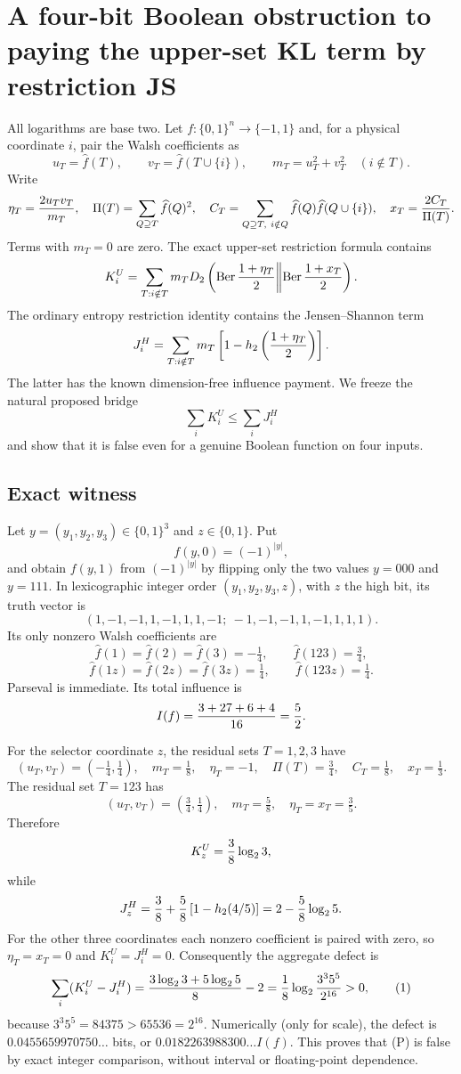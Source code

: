 \section*{A four-bit Boolean obstruction to paying the upper-set KL term by restriction JS}

All logarithms are base two.  Let $f:\{0,1\}^n\to\{-1,1\}$ and, for a
physical coordinate $i$, pair the Walsh coefficients as
\[
 u_T=\widehat f(T),\qquad v_T=\widehat f(T\cup\{i\}),\qquad
 m_T=u_T^2+v_T^2\quad (i\notin T).
\]
Write
\[
 \eta_T={2u_Tv_T\over m_T},\quad
 \Pi(T)=\sum_{Q\supseteq T}\widehat f(Q)^2,\quad
 C_T=\sum_{Q\supseteq T,\ i\notin Q}\widehat f(Q)\widehat f(Q\cup\{i\}),
 \quad x_T={2C_T\over\Pi(T)}.
\]
Terms with $m_T=0$ are zero.  The exact upper-set restriction formula contains
\[
 K_i^U=\sum_{T:i\notin T}m_T
 D_2\left(\operatorname{Ber}{1+\eta_T\over2}
 \middle\|\operatorname{Ber}{1+x_T\over2}\right).
\]
The ordinary entropy restriction identity contains the Jensen--Shannon term
\[
 J_i^H=\sum_{T:i\notin T}m_T
 \left[1-h_2\left({1+\eta_T\over2}\right)\right].
\]
The latter has the known dimension-free influence payment.  We freeze the
natural proposed bridge
\[
 \tag{P}\sum_i K_i^U\leq\sum_iJ_i^H
\]
and show that it is false even for a genuine Boolean function on four inputs.

\subsection*{Exact witness}

Let $y=(y_1,y_2,y_3)\in\{0,1\}^3$ and $z\in\{0,1\}$.  Put
\[
 f(y,0)=(-1)^{|y|},
\]
and obtain $f(y,1)$ from $(-1)^{|y|}$ by flipping only the two values
$y=000$ and $y=111$.  In lexicographic integer order $(y_1,y_2,y_3,z)$,
with $z$ the high bit, its truth vector is
\[
 (1,-1,-1,1,-1,1,1,-1;\ -1,-1,-1,1,-1,1,1,1).
\]
Its only nonzero Walsh coefficients are
\[
 \widehat f(1)=\widehat f(2)=\widehat f(3)=-\tfrac14,
 \qquad \widehat f(123)=\tfrac34,
\]
\[
 \widehat f(1z)=\widehat f(2z)=\widehat f(3z)=\tfrac14,
 \qquad \widehat f(123z)=\tfrac14.
\]
Parseval is immediate.  Its total influence is
\[
 I(f)={3+27+6+4\over16}={5\over2}.
\]

For the selector coordinate $z$, the residual sets $T=1,2,3$ have
\[
 (u_T,v_T)=(-\tfrac14,\tfrac14),\quad m_T=\tfrac18,
 \quad\eta_T=-1,\quad \Pi(T)=\tfrac34,\quad C_T=\tfrac18,
 \quad x_T=\tfrac13.
\]
The residual set $T=123$ has
\[
 (u_T,v_T)=(\tfrac34,\tfrac14),\quad m_T=\tfrac58,
 \quad\eta_T=x_T=\tfrac35.
\]
Therefore
\[
 K_z^U={3\over8}\log_2 3,
\]
while
\[
 J_z^H={3\over8}+{5\over8}\left[1-h_2(4/5)\right]
       =2-{5\over8}\log_2 5.
\]
For the other three coordinates each nonzero coefficient is paired with zero,
so $\eta_T=x_T=0$ and $K_i^U=J_i^H=0$.  Consequently the aggregate defect is
\[
 \sum_i(K_i^U-J_i^H)
 ={3\log_2 3+5\log_2 5\over8}-2
 ={1\over8}\log_2{3^3 5^5\over2^{16}}>0,\tag{1}
\]
because $3^3 5^5=84375>65536=2^{16}$.  Numerically (only for scale),
the defect is $0.0455659970750\ldots$ bits, or
$0.0182263988300\ldots I(f)$.  This proves that (P) is false by exact integer
comparison, without interval or floating-point dependence.

